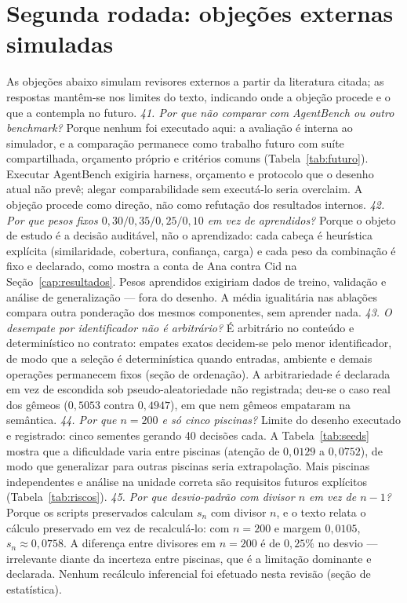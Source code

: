 \section{Segunda rodada: objeções externas simuladas}
As objeções abaixo simulam revisores externos a partir da literatura citada; as respostas mantêm-se nos limites do texto, indicando onde a objeção procede e o que a contempla no futuro.
\textit{41. Por que não comparar com AgentBench ou outro benchmark?} Porque nenhum foi executado aqui: a avaliação é interna ao simulador, e a comparação permanece como trabalho futuro com suíte compartilhada, orçamento próprio e critérios comuns (Tabela~\ref{tab:futuro}). Executar AgentBench \cite{agentbench2023} exigiria harness, orçamento e protocolo que o desenho atual não prevê; alegar comparabilidade sem executá-lo seria overclaim. A objeção procede como direção, não como refutação dos resultados internos.
\textit{42. Por que pesos fixos $0{,}30/0{,}35/0{,}25/0{,}10$ em vez de aprendidos?} Porque o objeto de estudo é a decisão auditável, não o aprendizado: cada cabeça é heurística explícita (similaridade, cobertura, confiança, carga) e cada peso da combinação é fixo e declarado, como mostra a conta de Ana contra Cid na Seção~\ref{cap:resultados}. Pesos aprendidos exigiriam dados de treino, validação e análise de generalização --- fora do desenho. A média igualitária nas ablações compara outra ponderação dos mesmos componentes, sem aprender nada.
\textit{43. O desempate por identificador não é arbitrário?} É arbitrário no conteúdo e determinístico no contrato: empates exatos decidem-se pelo menor identificador, de modo que a seleção é determinística quando entradas, ambiente e demais operações permanecem fixos (seção de ordenação). A arbitrariedade é declarada em vez de escondida sob pseudo-aleatoriedade não registrada; deu-se o caso real dos gêmeos ($0{,}5053$ contra $0{,}4947$), em que nem gêmeos empataram na semântica.
\textit{44. Por que $n=200$ e só cinco piscinas?} Limite do desenho executado e registrado: cinco sementes gerando 40 decisões cada. A Tabela~\ref{tab:seeds} mostra que a dificuldade varia entre piscinas (atenção de $0{,}0129$ a $0{,}0752$), de modo que generalizar para outras piscinas seria extrapolação. Mais piscinas independentes e análise na unidade correta são requisitos futuros explícitos (Tabela~\ref{tab:riscos}).
\textit{45. Por que desvio-padrão com divisor $n$ em vez de $n-1$?} Porque os scripts preservados calculam $s_n$ com divisor $n$, e o texto relata o cálculo preservado em vez de recalculá-lo: com $n=200$ e margem $0{,}0105$, $s_n\approx0{,}0758$. A diferença entre divisores em $n=200$ é de $0{,}25\%$ no desvio --- irrelevante diante da incerteza entre piscinas, que é a limitação dominante e declarada. Nenhum recálculo inferencial foi efetuado nesta revisão (seção de estatística).
